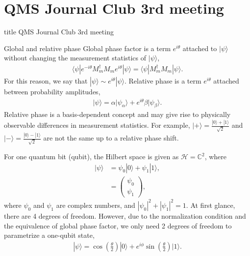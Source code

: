 \documentclass{beamer}
\begin{document}
\section{QMS Journal Club 3rd meeting}
\begin{frame}
\vfill
\centering
\begin{beamercolorbox}[sep=8pt,center,shadow=true,rounded=true]{title}
\Large QMS Journal Club 3rd meeting
\end{beamercolorbox}
\vfill
\end{frame}

\begin{frame}{Global and relative phase}
\justify
Global phase factor is a term $e^{i \theta}$ attached to $|\psi\rangle$ without changing the measurement statistics of $|\psi\rangle$,
\begin{align}
\langle \psi|e^{-i \theta} M^\dagger_m M_m e^{i \theta}|\psi\rangle = \langle \psi| M^\dagger_m M_m |\psi\rangle.
\end{align}
\vfill
For this reason, we say that $|\psi\rangle \sim e^{i \theta} |\psi\rangle$.
\vfill
Relative phase is a term $e^{i \theta}$ attached between probability amplitudes,
\begin{align}
|\psi\rangle = \alpha |\psi_\alpha\rangle + e^{i \theta} \beta |\psi_\beta\rangle.
\end{align}
\vfill
Relative phase is a basis-dependent concept and may give rise to physically observable differences in measurement statistics.
\vfill
For example, $|+\rangle = \frac{|0\rangle + |1\rangle}{\sqrt{2}}$ and $|-\rangle = \frac{|0\rangle - |1\rangle}{\sqrt{2}}$ are not the same up to a relative phase shift.
\end{frame}

\begin{frame}
\justify
For one quantum bit (qubit), the Hilbert space is given as $\mathcal{H} = \mathbb{C}^2$, where
\begin{align}
|\psi\rangle & = \psi_0 |0\rangle + \psi_1 |1\rangle, \\
& = \begin{pmatrix} \psi_0 \\ \psi_1 \end{pmatrix},
\end{align}
where $\psi_0$ and $\psi_1$ are complex numbers, and $|\psi_0|^2 + |\psi_1|^2 = 1$.
\vfill
At first glance, there are 4 degrees of freedom. However, due to the normalization condition and the equivalence of global phase factor, we only need 2 degrees of freedom to parametrize a one-qubit state,
\begin{align}
|\psi\rangle = \cos\left(\frac{\theta}{2}\right) |0\rangle + e^{i \phi} \sin\left(\frac{\theta}{2}\right) |1\rangle.
\end{align}
\end{frame}
\end{document}
